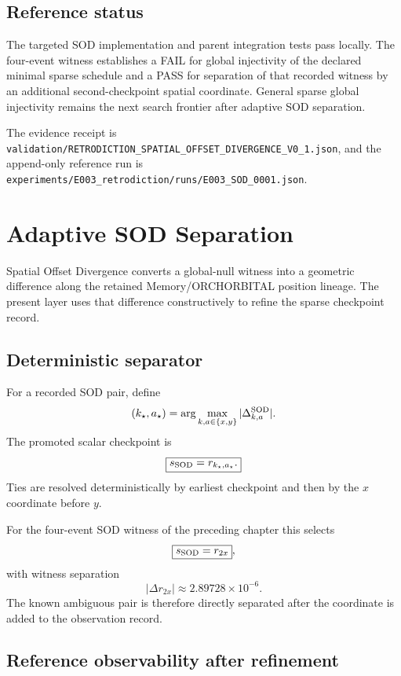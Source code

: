 \section{Reference status}

The targeted SOD implementation and parent integration tests pass locally. The four-event witness establishes a FAIL for global injectivity of the declared minimal sparse schedule and a PASS for separation of that recorded witness by an additional second-checkpoint spatial coordinate. General sparse global injectivity remains the next search frontier after adaptive SOD separation.

The evidence receipt is
\texttt{validation/RETRODICTION\_SPATIAL\_OFFSET\_DIVERGENCE\_V0\_1.json},
and the append-only reference run is
\texttt{experiments/E003\_retrodiction/runs/E003\_SOD\_0001.json}.


\chapter{Adaptive SOD Separation}

Spatial Offset Divergence converts a global-null witness into a geometric difference along the retained Memory/ORCHORBITAL position lineage. The present layer uses that difference constructively to refine the sparse checkpoint record.

\section{Deterministic separator}

For a recorded SOD pair, define
\[
(k_\star,a_\star)=\arg\max_{k,a\in\{x,y\}}|\Delta^{\rm SOD}_{k,a}|.
\]
The promoted scalar checkpoint is
\[
\boxed{s_{\rm SOD}=r_{k_\star,a_\star}.}
\]
Ties are resolved deterministically by earliest checkpoint and then by the $x$ coordinate before $y$.

For the four-event SOD witness of the preceding chapter this selects
\[
\boxed{s_{\rm SOD}=r_{2x}},
\]
with witness separation
\[
|\Delta r_{2x}|\approx2.89728\times10^{-6}.
\]
The known ambiguous pair is therefore directly separated after the coordinate is added to the observation record.

\section{Reference observability after refinement}


